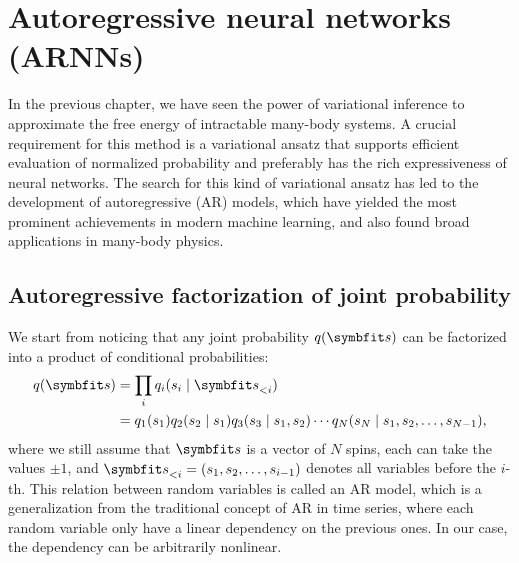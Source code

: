\chapter{Autoregressive neural networks (ARNNs)}
\label{ch:arnn}

In the previous chapter, we have seen the power of variational inference to approximate the free energy of intractable many-body systems. A crucial requirement for this method is a variational ansatz that supports efficient evaluation of normalized probability and preferably has the rich expressiveness of neural networks. The search for this kind of variational ansatz has led to the development of autoregressive (AR) models, which have yielded the most prominent achievements in modern machine learning, and also found broad applications in many-body physics.

\section{Autoregressive factorization of joint probability}

We start from noticing that any joint probability $q(\vs)$ can be factorized into a product of conditional probabilities:
\begin{align}
q(\vs) &= \prod_i q_i(s_i \mid \vs_{< i}) \label{eq:autoreg} \\
&= q_1(s_1) q_2(s_2 \mid s_1) q_3(s_3 \mid s_1, s_2) \cdots q_N(s_N \mid s_1, s_2, \ldots, s_{N - 1}),
\end{align}
where we still assume that $\vs$ is a vector of $N$ spins, each can take the values $\pm 1$, and $\vs_{< i} = (s_1, s_2, \ldots, s_{i - 1})$ denotes all variables before the $i$-th. This relation between random variables is called an AR model, which is a generalization from the traditional concept of AR in time series, where each random variable only have a linear dependency on the previous ones. In our case, the dependency can be arbitrarily nonlinear.

